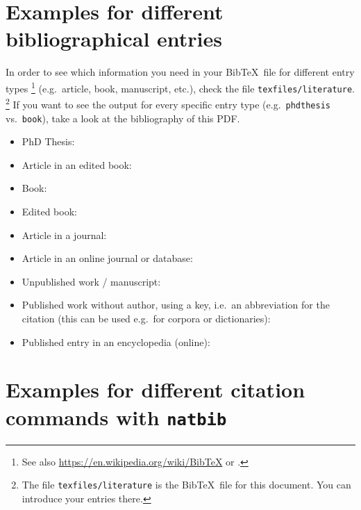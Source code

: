 \section{Examples for different bibliographical entries}
\label{ch:BibEntries}


In order to see which information you need in your Bib\TeX\ file for different entry types%
	\footnote{See also \url{https://en.wikipedia.org/wiki/BibTeX} or \citet{Freitag&MyP15a}.} %
(e.g.\ article, book, manuscript, etc.), check the file \texttt{texfiles/literature}.%
	\footnote{The file \texttt{texfiles/literature} is the Bib\TeX\ file for this document. You can introduce your entries there.} %
If you want to see the output for every specific entry type (e.g.\ \texttt{phdthesis} vs.\ \texttt{book}), take a look at the bibliography of this PDF.


\begin{itemize}
	\item PhD Thesis: \citet{Abney87a}
	
	\item Article in an edited book: \citet{Ackema15a}
	
	\item Book: \citet{Adger04a}
	
	\item Edited book: \citet{MyP&Co14b}
	
	\item Article in a journal: \citet{Barwise&Co81a}
	
	\item Article in an online journal or database:
	\citet{Kolb&Co10a}
	
	\item Unpublished work / manuscript: \citet{LeipzigGloss15a}
	
	\item Published work without author, using a key, i.e.\ an abbreviation for the citation (this can be used e.g.\ for corpora or dictionaries): \citep{DR17a}
	
	\item Published entry in an encyclopedia (online): \citet{MyP18b}
\end{itemize}


\section{Examples for different citation commands with \texttt{natbib}}
\label{ch:CitationCommands}

